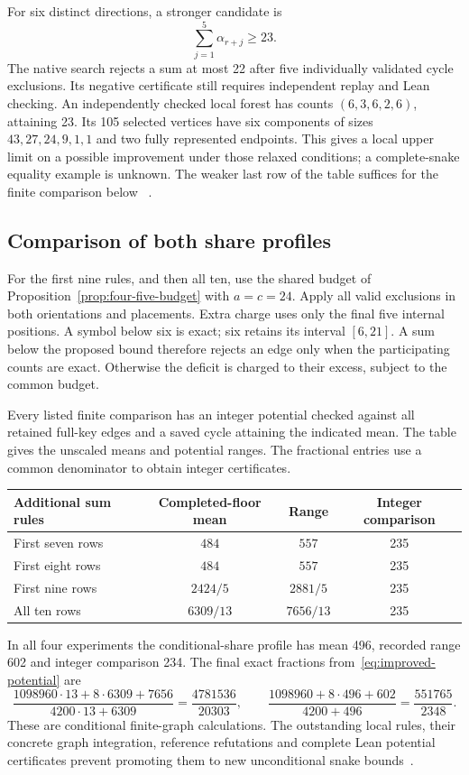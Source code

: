 \documentclass[11pt,a4paper]{article}
\theoremstyle{definition}
\theoremstyle{remark}
\begin{document}
For six distinct directions, a stronger candidate is
\[
\sum_{j=1}^{5}\alpha_{r+j}\ge23.
\]
The native search rejects a sum at most 22 after five individually validated
cycle exclusions. Its negative certificate still requires independent
replay and Lean checking. An independently checked local forest has counts
$(6,3,6,2,6)$, attaining 23. Its 105 selected vertices have six components
of sizes $43,27,24,9,1,1$ and two fully represented endpoints. This gives
a local upper limit on a possible improvement under those relaxed
conditions; a complete-snake equality example is unknown. The weaker
last row of the table suffices for the finite comparison below
~\cite{totalcountarchive}.

\subsection{Comparison of both share profiles}
For the first nine rules, and then all ten, use the shared budget of
Proposition~\ref{prop:four-five-budget} with $a=c=24$. Apply all valid
exclusions in both orientations and placements. Extra charge uses only
the final five internal positions. A symbol below six is exact; six
retains its interval $[6,21]$. A sum below the proposed bound therefore
rejects an edge only when the participating counts are exact. Otherwise
the deficit is charged to their excess, subject to the common budget.

Every listed finite comparison has an integer potential checked against
all retained full-key edges and a saved cycle attaining the indicated
mean. The table gives the unscaled means and potential ranges. The
fractional entries use a common denominator to obtain integer certificates.
\begin{center}\small
\begin{tabular}{l c c c}
\toprule
Additional sum rules & Completed-floor mean & Range & Integer comparison\\\midrule
First seven rows & $484$ & $557$ & 235\\
First eight rows & $484$ & $557$ & 235\\
First nine rows & $2424/5$ & $2881/5$ & 235\\
All ten rows & $6309/13$ & $7656/13$ & 235\\\bottomrule
\end{tabular}
\end{center}
In all four experiments the conditional-share profile has mean 496,
recorded range 602 and integer comparison 234. The final exact fractions
from~\eqref{eq:improved-potential} are
\[
\frac{1098960\cdot13+8\cdot6309+7656}{4200\cdot13+6309}
=\frac{4781536}{20303},\qquad
\frac{1098960+8\cdot496+602}{4200+496}
=\frac{551765}{2348}.
\]
These are conditional finite-graph calculations. The outstanding local
rules, their concrete graph integration, reference refutations and complete
Lean potential certificates prevent promoting them to new unconditional
snake bounds~\cite{sumbudgetarchive,pairbudgetarchive,totalcountarchive}.
\end{document}

